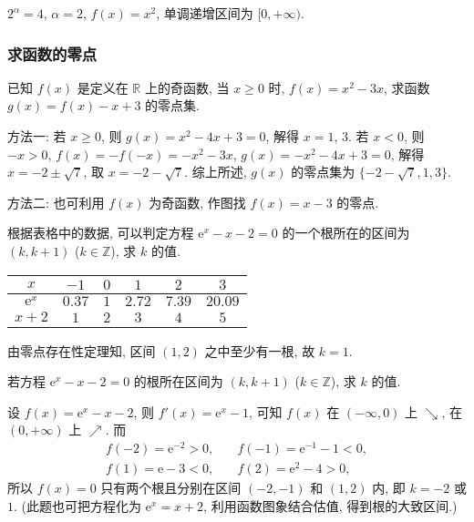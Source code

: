   \beginsolution
    $2^\alpha=4$, $\alpha=2$, $f(x)=x^2$, 单调递增区间为 $[0,+\infty)$.
  \endsolution
  
  \subsubsection{求函数的零点}
  \begin{example}
    已知 $f(x)$ 是定义在 $\mathbb{R}$ 上的奇函数, 
    当 $x\geqslant 0$ 时, $f(x)=x^2 -3x$, 
    求函数 $g(x)=f(x)-x+3$ 的零点集.
  \end{example}

  \beginsolution
    方法一: 若 $x\geqslant 0$, 则 $g(x)=x^2-4x+3=0$, 解得 $x=1$, $3$.
    若 $x<0$, 则 $-x>0$, $f(x)=-f(-x)=-x^2-3x$, $g(x)=-x^2-4x+3=0$, 解得 $x=-2\pm\sqrt7$, 取 $x=-2-\sqrt7$. 综上所述, $g(x)$ 的零点集为 $\{-2-\sqrt7, 1, 3\}$.
    
    方法二: 也可利用 $f(x)$ 为奇函数, 作图找 $f(x)=x-3$ 的零点.
  \endsolution
  
  \begin{example}
    根据表格中的数据, 可以判定方程 $\mathrm{e}^x -x-2=0$ 
    的一个根所在的区间为 $(k,k+1)$ ($k\in \mathbb{Z}$),
    求 $k$ 的值.
    \begin{center}
    \small
    \begin{tabular}{cccccc}
      \toprule
      $x$ & $-1$ & $0$ & $1$ & $2$ & $3$\\
      \midrule
      $\mathrm{e}^x$ & $0.37$ & $1$ & $2.72$ & $7.39$ & $20.09$\\
      $x+2$ & $1$ & $2$ & $3$ & $4$ & $5$ \\
      \bottomrule
    \end{tabular}
    \end{center}
  \end{example}

  \beginsolution
    由零点存在性定理知, 区间 $(1,2)$ 之中至少有一根, 故 $k=1$.
    
    \varexercise 若方程 $\mathrm{e}^x -x-2=0$ 的根所在区间为 $(k,k+1)$ ($k\in \mathbb{Z}$), 求 $k$ 的值.
    
    设 $f(x)=\mathrm{e}^x -x-2$, 则 $f'(x)=\mathrm{e}^x-1$, 可知 $f(x)$ 在 $(-\infty,0)$ 上 $\searrow$, 在 $(0,+\infty)$ 上 $\nearrow$. 而
    \begin{align*}
      f(-2)= \mathrm{e}^{-2}>0,&\quad f(-1)=\mathrm{e}^{-1}-1<0,\\
      f(1)=\mathrm{e}-3<0,&\quad f(2)=\mathrm{e}^2-4>0,
    \end{align*}
    所以 $f(x)=0$ 只有两个根且分别在区间 $(-2,-1)$ 和 $(1,2)$ 内, 即 $k=-2$ 或 $1$. (此题也可把方程化为 $\mathrm{e}^x=x+2$, 利用函数图象结合估值, 得到根的大致区间.)
    
